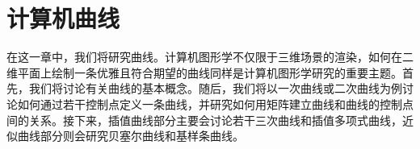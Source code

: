 \chapter{计算机曲线}

在这一章中，我们将研究曲线。计算机图形学不仅限于三维场景的渲染，如何在二维平面上绘制一条优雅且符合期望的曲线同样是计算机图形学研究的重要主题。首先，我们将讨论有关曲线的基本概念。随后，我们将以一次曲线或二次曲线为例讨论如何通过若干控制点定义一条曲线，并研究如何用矩阵建立曲线和曲线的控制点间的关系。接下来，插值曲线部分主要会讨论若干三次曲线和插值多项式曲线，近似曲线部分则会研究贝塞尔曲线和基样条曲线。




